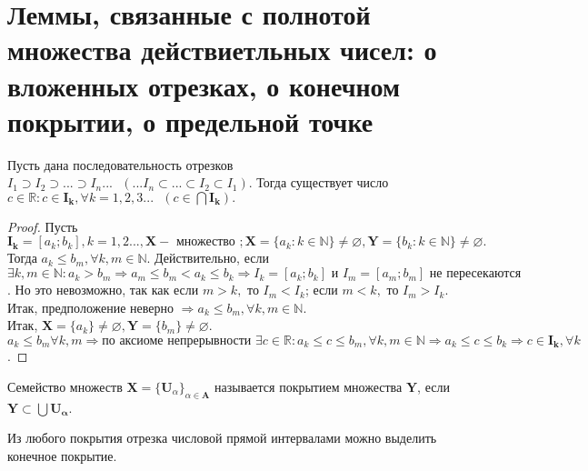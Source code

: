 \section{Леммы, связанные с полнотой множества действиетльных чисел: о вложенных отрезках, о конечном покрытии, о предельной точке}

\begin{theorem}
	Пусть дана последовательность отрезков $I_1 \supset I_2 \supset ... \supset I_n ... \mbox{ }(... I_n \subset ... \subset I_2 \subset I_1)$. Тогда существует число $c \in \mathbb{R}: c \in \mathbf{I_k}, \forall k = 1, 2, 3... \mbox{ } (c \in \bigcap \mathbf{I_k}).$
\end{theorem}

\begin{proof}
	Пусть $\mathbf{I_k} = [a_k; b_k], k = 1, 2..., \mathbf{X} - \mbox{ множество }; \mathbf{X} = \{a_k: k \in \mathbb{N}\} \neq \varnothing, \mathbf{Y} = \{b_k: k \in \mathbb{N}\} \neq \varnothing.$ Тогда $a_k \le b_m, \forall k, m \in \mathbb{N}.$ Действительно, если $\exists k, m \in \mathbb{N}: a_k > b_m \Rightarrow a_m \le b_m < a_k \le b_k \Rightarrow I_k = [a_k; b_k] \mbox{ и } I_m = [a_m; b_m] \mbox{ не пересекаются}$. Но это невозможно, так как если $m > k, \mbox{ то } I_m < I_k$; если $m < k, \mbox{ то } I_m > I_k$. \\
	Итак, предположение неверно $\Rightarrow a_k \le b_m, \forall k, m \in \mathbb{N}.$ \\
	Итак, $\mathbf{X} = \{a_k\} \neq \varnothing, \mathbf{Y} = \{b_m\} \neq \varnothing.$ \\
	$a_k \leq b_m \forall k, m \Rightarrow \mbox{по аксиоме непрерывности } \exists c \in \mathbb{R}: a_k \leq c \leq b_m, \forall k, m \in \mathbb{N} \Rightarrow a_k \leq c \leq b_k \Rightarrow c \in \mathbf{I_k}, \forall k$.
\end{proof}

\begin{definition}
	Семейство множеств $\mathbf{X} = \{\mathbf{U}_\alpha\}_{\alpha \in \mathbf{A}}$ называется покрытием множества $\mathbf{Y}$, если $\mathbf{Y} \subset \bigcup \mathbf{U_\alpha}$.
\end{definition}

\begin{theorem}
	Из любого покрытия отрезка числовой прямой интервалами можно выделить конечное покрытие.
\end{theorem}

